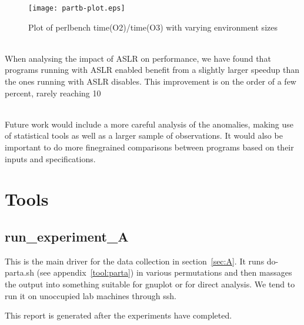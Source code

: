 \documentclass{article}
\begin{document}
\begin{figure}[!b]
  \begin{center}
    \texttt{[image: partb-plot.eps]}
  \end{center}
  \caption{Plot of perlbench time(O2)/time(O3) with varying environment sizes}
\end{figure}


\\

When analysing the impact of ASLR on performance, we have found that programs running with ASLR enabled benefit from a slightly larger speedup than the ones running with ASLR disables. This improvement is on the order of a few percent, rarely reaching 10%
\\
\begin{framed}
    \label{lst:inactive}
    
\end{framed}

\\
Future work would include a more careful analysis of the anomalies, making use of statistical tools as well as a larger sample of observations. It would also be important to do more finegrained comparisons between programs based on their inputs and specifications.

\newpage
\appendix
\section{Tools}

\subsection{run\_experiment\_A} \label{tool:run}
This is the main driver for the data collection in section~\ref{sec:A}.
It runs do-parta.sh (see appendix~\ref{tool:parta}) in various permutations
and then massages the output into something suitable for gnuplot or for direct
analysis. We tend to run it on unoccupied lab machines through ssh.

This report is generated after the experiments have completed.
\end{document}
